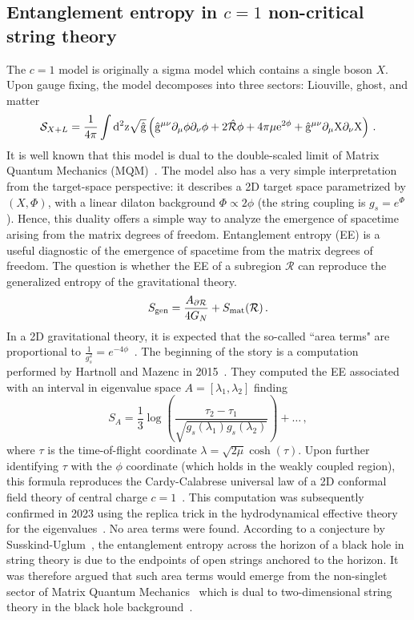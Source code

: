 \documentclass[a4paper]{article}
\begin{document}
\subsection{Entanglement entropy in $c=1$ non-critical string theory}\label{subsec:EE}
The $c=1$ model is originally a sigma model which contains a single boson $X$. Upon gauge fixing, the model decomposes into three sectors: Liouville, ghost, and matter
\begin{equation}
  \mathcal{S}_{X+L} = \frac{1}{4\pi}\int \rm{d}^2z\sqrt{\hat{g}}\left(\hat{g}^{\mu \nu}\partial_\mu \phi \partial_\nu \phi+2\hat{\mathcal{R}}\phi+ 4\pi \mu e^{2\phi}+ \hat{g}^{\mu \nu}\partial_\mu X \partial_\nu X\right)\,.
\end{equation}
It is well known that this model is dual to the double-scaled limit of Matrix Quantum Mechanics (MQM)~\cite{ginsparg1993lectures2dgravity2d,klebanov2003stringtheorydimensions,Anninos_2020}. The model also has a very simple interpretation from the target-space perspective: it describes a 2D target space parametrized by $(X,\Phi)$, with a linear dilaton background $\Phi \propto 2\phi$ (the string coupling is $g_s = e^{\Phi}$). Hence, this duality offers a simple way to analyze the emergence of spacetime arising from the matrix degrees of freedom. Entanglement entropy (EE) is a useful diagnostic of the emergence of spacetime from the matrix degrees of freedom. The question is whether the EE of a subregion $\mathcal R$ can reproduce the generalized entropy of the gravitational theory.
\begin{equation}
  S_{\rm gen} = \frac{A_{\partial \mathcal{R}}}{4 G_{N}} + S_{\rm mat}(\mathcal{R})\,.
\end{equation}
In a 2D gravitational theory, it is expected that the so-called ``area terms" are proportional to $\frac{1}{g_s^2}=e^{-4\phi}$~\cite{craps2026areatermsentanglemententropy}. The beginning of the story is a computation performed by Hartnoll and Mazenc in 2015~\cite{Hartnoll_2015}. They computed the EE associated with an interval in eigenvalue space $A=[\lambda_1, \lambda_2]$ finding
\begin{equation}
  S_{A} = \frac{1}{3}\log\left(\frac{\tau_2-\tau_1}{\sqrt{g_s(\lambda_1)g_s(\lambda_2)}}\right)+ \dots\,,
\end{equation}
where $\tau$ is the time-of-flight coordinate $\lambda = \sqrt{2\mu} \cosh(\tau)$. Upon further identifying $\tau$ with the $\phi$ coordinate (which holds in the weakly coupled region), this formula reproduces the Cardy-Calabrese universal law of a 2D conformal field theory of central charge $c=1$~\cite{Pasquale_Calabrese_2004}. This computation was subsequently confirmed in 2023 using the replica trick in the hydrodynamical effective theory for the eigenvalues~\cite{Di_Ubaldo_2023}. No area terms were found. According to a conjecture by Susskind-Uglum~\cite{Susskind_1994}, the entanglement entropy across the horizon of a black hole in string theory is due to the endpoints of open strings anchored to the horizon. It was therefore argued that such area terms would emerge from the non-singlet sector of Matrix Quantum Mechanics~\cite{fliss2025matrixquantummechanicsentanglement} which is dual to two-dimensional string theory in the black hole background~\cite{Maldacena:2005hi,Kazakov_2002}.
\end{document}
